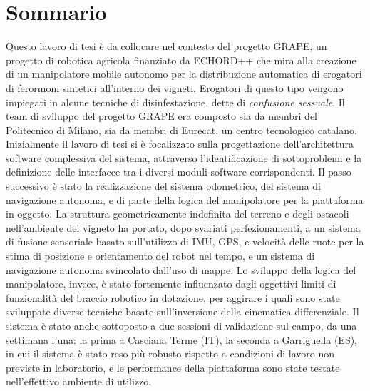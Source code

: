 \chapter*{Sommario}
Questo lavoro di tesi è da collocare nel contesto del progetto \acs{GRAPE}, un progetto di robotica agricola finanziato da \acs{ECHORD++} che mira alla creazione di un manipolatore mobile autonomo per la distribuzione automatica di erogatori di ferormoni sintetici all'interno dei vigneti. Erogatori di questo tipo vengono impiegati in alcune tecniche di disinfestazione, dette di \textit{confusione sessuale}. Il team di sviluppo del progetto \acs{GRAPE} era composto sia da membri del Politecnico di Milano, sia da membri di Eurecat, un centro tecnologico catalano. Inizialmente il lavoro di tesi si è focalizzato sulla progettazione dell'architettura software complessiva del sistema, attraverso l'identificazione di sottoproblemi e la definizione delle interfacce  tra i diversi moduli software corrispondenti. Il passo successivo è stato la realizzazione del sistema odometrico, del sistema di navigazione autonoma, e di parte della logica del manipolatore per la piattaforma in oggetto. 
La struttura geometricamente indefinita del terreno e degli ostacoli nell'ambiente del vigneto ha portato, dopo svariati perfezionamenti, a un sistema di fusione sensoriale basato sull'utilizzo di \acs{IMU}, GPS, e velocità delle ruote per la stima di posizione e orientamento del robot nel tempo, e un sistema di navigazione autonoma svincolato dall'uso di mappe. Lo sviluppo della logica del manipolatore, invece, è stato fortemente influenzato dagli oggettivi limiti di funzionalità del braccio robotico in dotazione, per aggirare i quali sono state sviluppate diverse tecniche basate sull'inversione della cinematica differenziale. Il sistema è stato anche sottoposto a due sessioni di validazione sul campo, da una settimana l'una: la prima a Casciana Terme (IT), la seconda a Garriguella (ES), in cui il sistema è stato reso più robusto rispetto a condizioni di lavoro non previste in laboratorio, e le performance della piattaforma sono state testate nell'effettivo ambiente di utilizzo.

\endgroup











